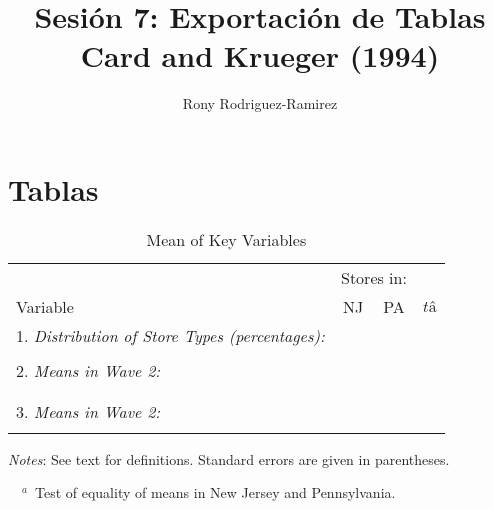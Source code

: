 \documentclass{article}
\begin{document}
\title{Sesión 7: Exportación de Tablas \\ Card and Krueger (1994)} 
\author{Rony Rodriguez-Ramirez}
\maketitle
\newpage 
\section{Tablas}
\setcounter{table}{1} 

\begin{table}[H]
	\centering
	\label{tab:Table}
		\begin{threeparttable}
			\caption{Mean of Key Variables}
			\begin{tabular}{@{}l*{3}{c}@{}}
                \toprule
				& \multicolumn{2}{c}{Stores in:} & 								\\ \cmidrule(lr){2-3}
				Variable & NJ & PA & $tâ$										\\
				\midrule
				1. \textit{Distribution of Store Types (percentages):} 	& & & 	\\
																		
																		& & & 	\\		
				2. \textit{Means in Wave 2:}							& & & 	\\			
																		& & & 	\\	
								
																		& & &	\\														
				3. \textit{Means in Wave 2:}							& & & 	\\
																		& & & 	\\			
				                		
				\bottomrule
			\end{tabular}
			\begin{tablenotes}
				\setlength{}
				\footnotesize
				\item \textit{Notes}: See text for definitions. Standard errors are given in parentheses.
				\item ~~$^a$~Test of equality of means in New Jersey and Pennsylvania.
			\end{tablenotes}
		\end{threeparttable}
\end{table}
\setcounter{table}{3} 
\end{document}
